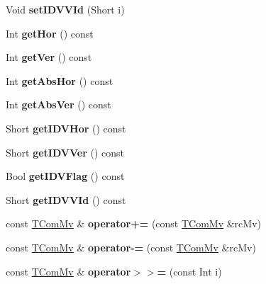 \begin{DoxyCompactItemize}
Void {\bfseries set\+I\+D\+V\+V\+Id} (Short i)
\item 
\mbox{\label{class_t_com_mv_a67aa4471fc572ebdf3a430637d3fe2ab}} 
Int {\bfseries get\+Hor} () const
\item 
\mbox{\label{class_t_com_mv_a707e0d88befeb7cdf0e0fdf7b74b9cd4}} 
Int {\bfseries get\+Ver} () const
\item 
\mbox{\label{class_t_com_mv_a05bc7043b116e431e9327ccfec098e39}} 
Int {\bfseries get\+Abs\+Hor} () const
\item 
\mbox{\label{class_t_com_mv_a34018916ac52049d21bab9caeb3e0f21}} 
Int {\bfseries get\+Abs\+Ver} () const
\item 
\mbox{\label{class_t_com_mv_a741d067fb03d15e78ab8d6e0456233a3}} 
Short {\bfseries get\+I\+D\+V\+Hor} () const
\item 
\mbox{\label{class_t_com_mv_afd1d3d3c696d94955d98990120db5881}} 
Short {\bfseries get\+I\+D\+V\+Ver} () const
\item 
\mbox{\label{class_t_com_mv_a4cd4c361d66f5fb95aaf9eac66a0f0d6}} 
Bool {\bfseries get\+I\+D\+V\+Flag} () const
\item 
\mbox{\label{class_t_com_mv_a48b174c599da760413d5f33af5b23fbe}} 
Short {\bfseries get\+I\+D\+V\+V\+Id} () const
\item 
\mbox{\label{class_t_com_mv_a4d8237e6e54125e78b730851087c39a5}} 
const \hyperlink{class_t_com_mv}{T\+Com\+Mv} \& {\bfseries operator+=} (const \hyperlink{class_t_com_mv}{T\+Com\+Mv} \&rc\+Mv)
\item 
\mbox{\label{class_t_com_mv_a7f586beb670db6b08292babdc53d8b74}} 
const \hyperlink{class_t_com_mv}{T\+Com\+Mv} \& {\bfseries operator-\/=} (const \hyperlink{class_t_com_mv}{T\+Com\+Mv} \&rc\+Mv)
\item 
\mbox{\label{class_t_com_mv_a610713fa09a21e4e94cddf0ade2a8c77}} 
const \hyperlink{class_t_com_mv}{T\+Com\+Mv} \& {\bfseries operator$>$$>$=} (const Int i)

\end{DoxyCompactItemize}
